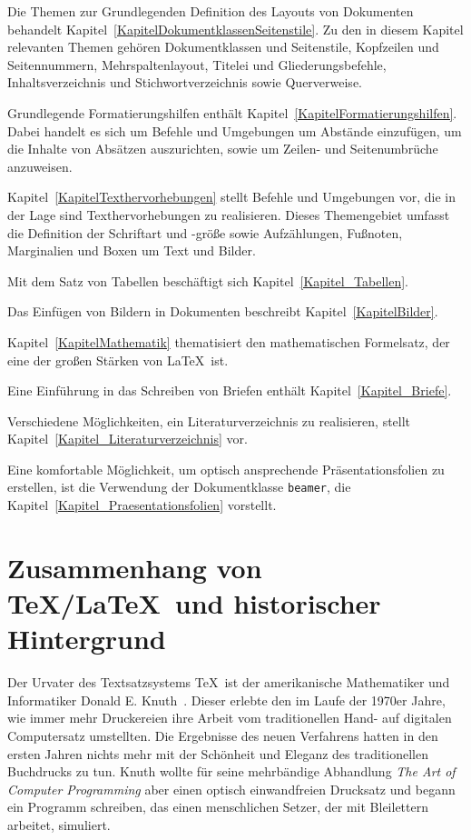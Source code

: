 Die Themen zur Grundlegenden Definition des Layouts von Dokumenten behandelt Kapitel~\ref{KapitelDokumentklassenSeitenstile}. Zu den in diesem Kapitel relevanten Themen gehören Dokumentklassen und Seitenstile, Kopfzeilen und Seitennummern, Mehrspaltenlayout, Titelei und Gliederungsbefehle, Inhaltsverzeichnis und Stichwortverzeichnis sowie Querverweise.


Grundlegende Formatierungshilfen enthält Kapitel~\ref{KapitelFormatierungshilfen}. Dabei handelt es sich um Befehle und Umgebungen um Abstände einzufügen, um die Inhalte von Absätzen auszurichten, sowie um Zeilen- und Seitenumbrüche anzuweisen.

Kapitel~\ref{KapitelTexthervorhebungen} stellt Befehle und Umgebungen vor, die in der Lage sind Texthervorhebungen zu realisieren. Dieses Themengebiet umfasst die Definition der Schriftart und -größe sowie Aufzählungen, Fußnoten, Marginalien und Boxen um Text und Bilder. 

Mit dem Satz von Tabellen beschäftigt sich Kapitel~\ref{Kapitel_Tabellen}.

Das Einfügen von Bildern in Dokumenten beschreibt Kapitel~\ref{KapitelBilder}.

Kapitel~\ref{KapitelMathematik} thematisiert den mathematischen Formelsatz, der eine der großen Stärken von \LaTeX\ ist.

Eine Einführung in das Schreiben von Briefen enthält Kapitel~\ref{Kapitel_Briefe}.

Verschiedene Möglichkeiten, ein Literaturverzeichnis zu realisieren, stellt Kapitel~\ref{Kapitel_Literaturverzeichnis} vor.

Eine komfortable Möglichkeit, um optisch ansprechende Präsentationsfolien zu erstellen, ist die Verwendung der Dokumentklasse \verb!beamer!, die Kapitel~\ref{Kapitel_Praesentationsfolien} vorstellt.


\section{Zusammenhang von \TeX/\LaTeX\ und historischer Hintergrund}






Der Urvater des Textsatzsystems \TeX\ ist der amerikanische Mathematiker und Informatiker 
Donald E. Knuth~\cite{DonaldKnuthWebpage}. Dieser erlebte den im Laufe der 1970er Jahre, wie immer mehr Druckereien ihre Arbeit vom traditionellen Hand- auf digitalen Computersatz umstellten. Die Ergebnisse des neuen Verfahrens hatten in den ersten Jahren nichts mehr mit der Schönheit und Eleganz des traditionellen Buchdrucks zu tun. Knuth wollte für seine mehrbändige Abhandlung \textsl{The Art of Computer Programming} aber einen optisch einwandfreien Drucksatz und begann ein Programm schreiben, das einen menschlichen Setzer, der mit Bleilettern arbeitet, simuliert. 

